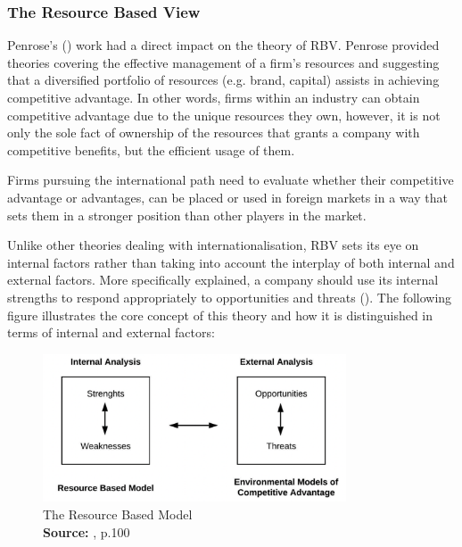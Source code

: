 \documentclass[11pt,a4paper]{article}
\newcommand*{\captionsource}[2]{%
  \caption[{#1}]{%
    #1%
    \\\hspace{\linewidth}%
    \textbf{Source:} #2%
  }%
}
\begin{document}
{{\subsubsection{The Resource Based View}
\vspace{-1mm}
 \par 
Penrose's (\citeyear{penroseTheoryGrowthFirm2009}) work had a direct impact on the theory of RBV.  Penrose provided theories covering the effective management of a firm's resources and suggesting that a diversified portfolio of resources (e.g. brand, capital) assists in achieving competitive advantage. In other words, firms within an industry can obtain competitive advantage due to the unique resources they own, however, it is not only the sole fact of ownership of the resources that grants a company with competitive benefits, but the efficient usage of them. \par
Firms pursuing the international path need to evaluate whether their competitive advantage or advantages, can be placed or used in foreign markets in a way that sets them in a stronger position than other players in the market. \par
Unlike other theories dealing with internationalisation, RBV sets its eye on internal factors rather than taking into account the interplay of both internal and external factors. More specifically explained, a company should use its internal strengths to respond appropriately to opportunities and threats (\cite{barneyFirmResourcesSustained1991}). The following figure illustrates the core concept of this theory and how it is distinguished in terms of internal and external factors: \\

\begin{figure}[H]
	\centering
  \includegraphics[width=90mm]{figures/fig5_rbv_model}
  \vspace{5mm}
    \captionsetup{justification=centering,margin=2cm}
      \captionsource{The Resource Based Model}{\cite{barneyFirmResourcesSustained1991}, p.100}
	\label{fig:rbv_model}
\end{figure}


}}
\end{document}

